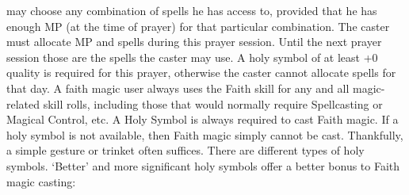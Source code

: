 \documentclass[twoside]{book}
\begin{document}
               may choose any combination of spells he has access to,
               provided that he has enough MP (at the time of prayer) for
               that particular combination. The caster must allocate MP
               and spells during this prayer session. Until the next
               prayer session those are the spells the caster may use. A
               holy symbol of at least +0 quality is required for this
               prayer, otherwise the caster cannot allocate spells for
               that day.   A faith magic user always uses the Faith skill for
               any and all magic-related skill rolls, including those
               that would normally require Spellcasting or Magical
               Control, etc.   A Holy Symbol is always required to cast Faith
               magic. If a holy symbol is not available, then Faith magic
               simply cannot be cast. Thankfully, a simple gesture or
               trinket often suffices. There are different types of holy
               symbols. `Better' and more significant holy
               symbols offer a better bonus to Faith magic casting:
               
\end{document}
